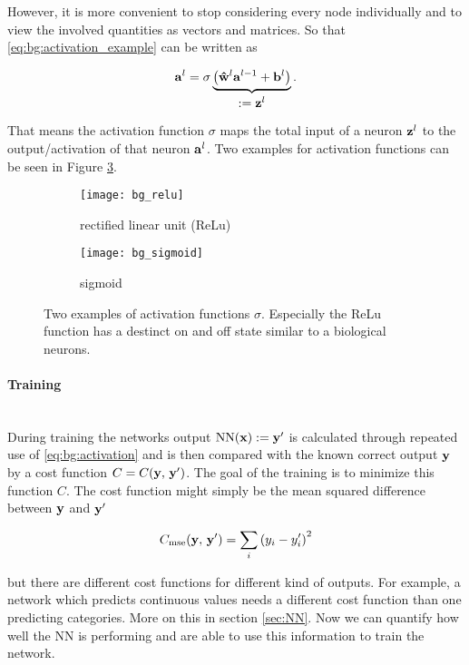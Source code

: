 \noindent
However, it is more convenient to stop considering every node individually and to view the involved quantities as vectors and matrices. So that \eqref{eq:bg:activation_example} can be written as

\begin{equation} \label{eq:bg:activation}
    \vb{a}^l = \sigma \underbrace{
    \qty(\vu{w}^l \vb{a}^{l-1} + \vb{b}^l)
    }_{
    \textstyle
    := \vb z^l
    }.
\end{equation}

That means the activation function $\sigma$ maps the total input of a neuron $\vb z^l$ to the output/activation of that neuron $\vb a^l$. Two examples for activation functions can be seen in Figure \ref{fig:al:act}.

\begin{figure}[H]
\centering
\begin{subfigure}{.5\textwidth}
    \centering
    \texttt{[image: bg\_relu]}
    \caption{rectified linear unit (ReLu)}
    \label{}
\end{subfigure}%
\begin{subfigure}{.5\textwidth}
    \centering
    \texttt{[image: bg\_sigmoid]}
    \caption{sigmoid}
    \label{}
\end{subfigure}
\caption{Two examples of activation functions $\sigma$. Especially the ReLu function has a destinct on and off state similar to a biological neurons.}
\label{fig:al:act}
\end{figure}

\paragraph{Training}~\\
\label{par:training}During training the networks output $\mathrm{NN}(\vb x) := \vb{y}' $ is calculated through repeated use of \eqref{eq:bg:activation} and is then compared with the known correct output $\vb y$ by a cost function $C = C(\vb y, \, \vb y')$. The goal of the training is to minimize this function $C$. The cost function might simply be the mean squared difference between $\vb y$ and $\vb y'$

\begin{equation}
    C_{\mathrm{mse}}(\vb y, \, \vb y') = \sum_i \qty(y_i - y_i')^2
\end{equation}

\noindent
but there are different cost functions for different kind of outputs. For example, a network which predicts continuous values needs a different cost function than one predicting categories. More on this in section \ref{sec:NN}. Now we can quantify how well the NN is performing and are able to use this information to train the network.
\\

